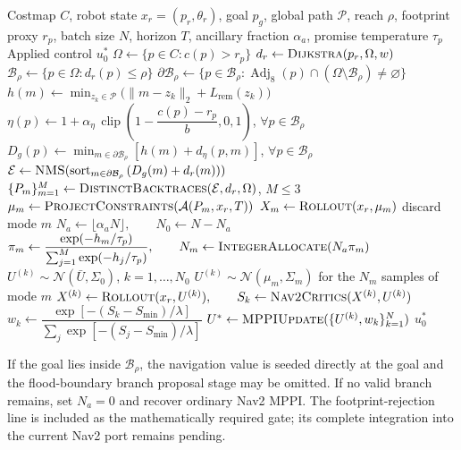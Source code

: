\documentclass[11pt,a4paper]{article}
\newcommand{\Free}{\Omega}
\newcommand{\B}{\mathcal{B}}
\newcommand{\N}{\mathcal{N}}
\newcommand{\Adj}{\operatorname{Adj}}
\newcommand{\Path}{\mathcal{P}}
\newcommand{\clip}{\operatorname{clip}}
\begin{document}
\begin{algorithm}[ht]
\caption{Geodesic Topology-Guided Ancillary Proposals for Biased MPPI}
\label{alg:amoeba-mppi}
\begin{algorithmic}[1]
\Require Costmap $C$, robot state $x_r=(p_r,\theta_r)$, goal $p_g$,
global path $\Path$, reach $\rho$, footprint proxy $r_p$, batch size $N$,
horizon $T$, ancillary fraction $\alpha_a$, promise temperature $\tau_p$
\Ensure Applied control $u_0^*$
\State $\Free \gets \{p\in C:c(p)>r_p\}$
\State $d_r \gets \Call{Dijkstra}{p_r,\Free,w}$
\State $\B_\rho \gets \{p\in\Free:d_r(p)\leq\rho\}$
\State $\partial\B_\rho \gets \{p\in\B_\rho:\Adj_8(p)\cap(\Free\setminus\B_\rho)\neq\varnothing\}$
\ForAll{$m\in\partial\B_\rho$}
  \State $h(m)\gets\displaystyle\min_{z_k\in\Path}
  \bigl(\lVert m-z_k\rVert_2+L_{\mathrm{rem}}(z_k)\bigr)$
\EndFor
\State $\eta(p)\gets 1+\alpha_\eta\,
\clip\!\left(1-\dfrac{c(p)-r_p}{b},0,1\right)$, $\forall p\in\B_\rho$
\State $D_g(p)\gets\displaystyle\min_{m\in\partial\B_\rho}
\left[h(m)+d_\eta(p,m)\right]$, $\forall p\in\B_\rho$
\State $\mathcal E\gets\Call{NMS}{\operatorname{sort}_{m\in\partial\B_\rho}
\left(D_g(m)+d_r(m)\right)}$
\State $\{P_m\}_{m=1}^{M}\gets
\Call{DistinctBacktraces}{\mathcal E,d_r,\Free}$, $M\leq3$
  \State $\mu_m\gets\Call{ProjectConstraints}{\mathcal A(P_m,x_r,T)}$
  \State $X_m\gets\Call{Rollout}{x_r,\mu_m}$
    \State discard mode $m$ 
  \EndIf
\EndFor
\State $N_a\gets\lfloor\alpha_aN\rfloor,\qquad N_0\gets N-N_a$
\State $\pi_m\gets\dfrac{\exp(-h_m/\tau_p)}
{\sum_{j=1}^{M}\exp(-h_j/\tau_p)},\qquad
N_m\gets\Call{IntegerAllocate}{N_a\pi_m}$
\State $U^{(k)}\sim\N(\bar U,\Sigma_0)$,
$k=1,\ldots,N_0$ 
  \State $U^{(k)}\sim\N(\mu_m,\Sigma_m)$ for the $N_m$ samples of mode $m$
\EndFor
\State $X^{(k)}\gets\Call{Rollout}{x_r,U^{(k)}},\qquad
S_k\gets\Call{Nav2Critics}{X^{(k)},U^{(k)}}$
\State $w_k\gets\dfrac{\exp[-(S_k-S_{\min})/\lambda]}
{\sum_j\exp[-(S_j-S_{\min})/\lambda]}$
\State $U^*\gets\Call{MPPIUpdate}{\{U^{(k)},w_k\}_{k=1}^{N}}$
\State \Return $u_0^*$
\end{algorithmic}
\end{algorithm}

If the goal lies inside $\B_\rho$, the navigation value is seeded directly
at the goal and the flood-boundary branch proposal stage may be omitted. If no
valid branch remains, set $N_a=0$ and recover ordinary Nav2 MPPI. The
footprint-rejection line is included as the mathematically required gate; its
complete integration into the current Nav2 port remains pending.
\end{document}
